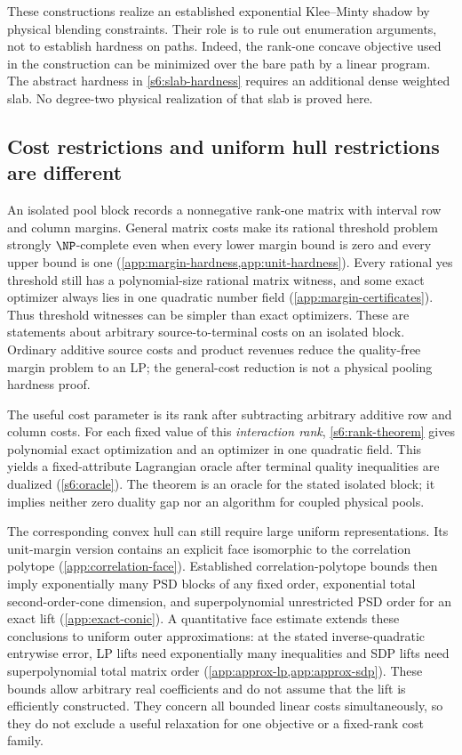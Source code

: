 These constructions realize an established exponential Klee--Minty
shadow \cite{s6:gartner2013} by physical blending constraints. Their role
is to rule out enumeration arguments, not to establish hardness on
paths. Indeed, the rank-one concave objective used in the construction
can be minimized over the bare path by a linear program. The abstract
hardness in \cref{s6:slab-hardness} requires an additional dense weighted
slab. No degree-two physical realization of that slab is proved here.

\subsection{Cost restrictions and uniform hull restrictions are different}
An isolated pool block records a nonnegative rank-one matrix with
interval row and column margins. General matrix costs make its rational
threshold problem strongly $\NP$-complete even when every lower margin
bound is zero and every upper bound is one
(\cref{app:margin-hardness,app:unit-hardness}). Every rational yes threshold
still has a polynomial-size rational matrix witness, and some exact
optimizer always lies in one quadratic number field
(\cref{app:margin-certificates}). Thus threshold witnesses can be simpler
than exact optimizers. These are statements about arbitrary
source-to-terminal costs on an isolated block. Ordinary additive source
costs and product revenues reduce the quality-free margin problem to an
LP; the general-cost reduction is not a physical pooling hardness proof.

The useful cost parameter is its rank after subtracting arbitrary
additive row and column costs. For each fixed value of this
\emph{interaction rank}, \cref{s6:rank-theorem} gives polynomial exact
optimization and an optimizer in one quadratic field. This yields a
fixed-attribute Lagrangian oracle after terminal quality inequalities
are dualized (\cref{s6:oracle}). The theorem is an oracle for the stated
isolated block; it implies neither zero duality gap nor an algorithm
for coupled physical pools.

The corresponding convex hull can still require large uniform
representations. Its unit-margin version contains an explicit face
isomorphic to the correlation polytope (\cref{app:correlation-face}).
Established correlation-polytope bounds then imply exponentially many
PSD blocks of any fixed order, exponential total second-order-cone
dimension, and superpolynomial unrestricted PSD order for an exact lift
(\cref{app:exact-conic}). A quantitative face estimate extends these
conclusions to uniform outer approximations: at the stated
inverse-quadratic entrywise error, LP lifts need exponentially many
inequalities and SDP lifts need superpolynomial total matrix order
(\cref{app:approx-lp,app:approx-sdp}). These bounds allow arbitrary real
coefficients and do not assume that the lift is efficiently constructed.
They concern all bounded linear costs simultaneously, so they do not
exclude a useful relaxation for one objective or a fixed-rank cost family.

